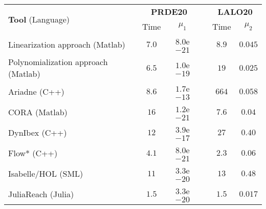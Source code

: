 \begin{center}
\begin{footnotesize}
\begin{tabular}{l  c c  c  c c}
 \toprule
 \multirow{2}{*}{\textbf{Tool} (Language)} & \multicolumn{2}{c}{\textbf{PRDE20}} & & \multicolumn{2}{c}{\textbf{LALO20}} \\ \cmidrule{2-3} \cmidrule{5-6}
  & Time & $\mu_1$ & & Time & $\mu_2$ \\ \midrule
 Linearization approach (Matlab)		& $7.0$ 	& $8.0$e$-21$ & & $8.9$ 	& $0.045$ \\ \midrule
 Polynomialization approach	(Matlab)	& $6.5$ 	& $1.0$e$-19$ & & $19$      & $0.025$ \\ \midrule
 Ariadne (C++)				            & $8.6$ 	& $1.7$e$-13$ & & $664$ 	& $0.058$ \\ \midrule
 CORA (Matlab)				            & $16$ 	    & $1.2$e$-21$ & & $7.6$ 	& $0.04$ \\ \midrule
 DynIbex (C++)				            & $12$ 	    & $3.9$e$-17$ & & $27$ 	    & $0.40$ \\ \midrule
 Flow* (C++)				            & $4.1$ 	& $8.0$e$-21$ & & $2.3$ 	& $0.06$ \\ \midrule
 Isabelle/HOL (SML)			            & $11$ 	    & $3.3$e$-20$ & & $13$ 	    & $0.48$ \\ \midrule
 JuliaReach (Julia)			            & $1.5$ 	& $3.3$e$-20$ & & $1.5$ 	& $0.017$ \\
\bottomrule 
\end{tabular}
\end{footnotesize}
\end{center}
